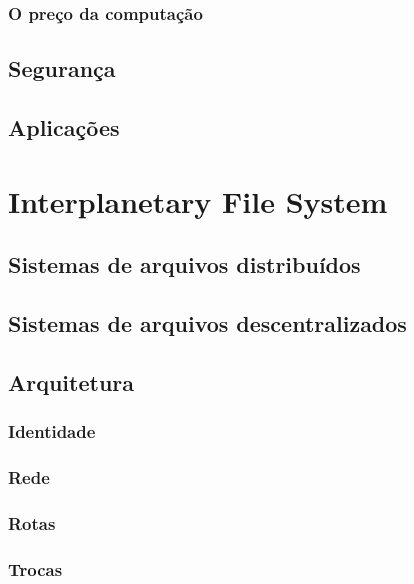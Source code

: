 \documentclass[tcc,capa]{texufpel}
\begin{document}
    	\subsubsection{O preço da computação}

	\subsection{Segurança}
	
	
    
    \subsection{Aplicações}
    
\section{Interplanetary File System}

	\subsection{Sistemas de arquivos distribuídos}
    
    \subsection{Sistemas de arquivos descentralizados}

	\subsection{Arquitetura}
    
    	\subsubsection{Identidade}
        
        \subsubsection{Rede}
        
        \subsubsection{Rotas}
        
        \subsubsection{Trocas}
        
\end{document}
